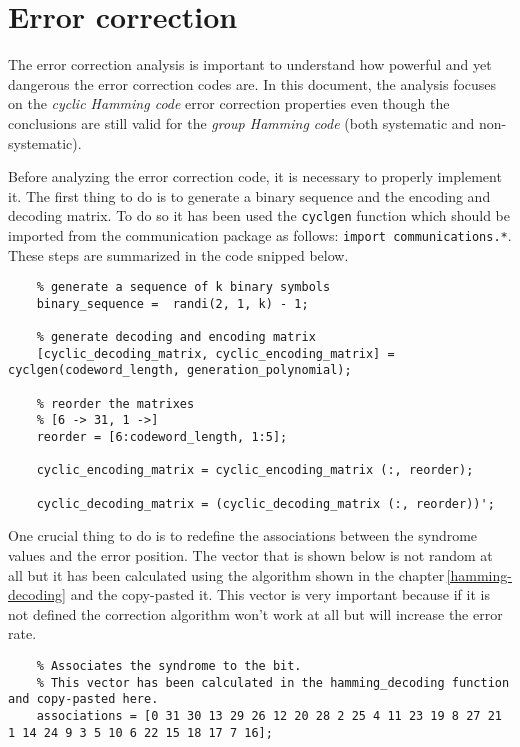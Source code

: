 \vspace{40px} \section{Error correction} \label{ciclic-coding}
The error correction analysis is important to understand how powerful and yet dangerous the error correction codes are. In this document, the analysis focuses on the \textsl{cyclic Hamming code} error correction properties even though the conclusions are still valid for the \textsl{group Hamming code} (both systematic and non-systematic). 

Before analyzing the error correction code, it is necessary to properly implement it. The first thing to do is to generate a binary sequence and the encoding and decoding matrix. To do so it has been used the \texttt{cyclgen} function which should be imported from the communication package as follows: \texttt{import communications.*}. These steps are summarized in the code snipped below.

\begin{lstlisting} 
    % generate a sequence of k binary symbols
    binary_sequence =  randi(2, 1, k) - 1;

    % generate decoding and encoding matrix
    [cyclic_decoding_matrix, cyclic_encoding_matrix] = cyclgen(codeword_length, generation_polynomial);

    % reorder the matrixes
    % [6 -> 31, 1 ->]
    reorder = [6:codeword_length, 1:5];

    cyclic_encoding_matrix = cyclic_encoding_matrix (:, reorder); 

    cyclic_decoding_matrix = (cyclic_decoding_matrix (:, reorder))'; 
\end{lstlisting}

\noindent One crucial thing to do is to redefine the associations between the syndrome values and the error position. The vector that is shown below is not random at all but it has been calculated using the algorithm shown in the chapter\,\ref{hamming-decoding} and the copy-pasted it. This vector is very important because if it is not defined the correction algorithm won't work at all but will increase the error rate.

\begin{lstlisting} 
    % Associates the syndrome to the bit.
    % This vector has been calculated in the hamming_decoding function and copy-pasted here.
    associations = [0 31 30 13 29 26 12 20 28 2 25 4 11 23 19 8 27 21 1 14 24 9 3 5 10 6 22 15 18 17 7 16];
\end{lstlisting} 

